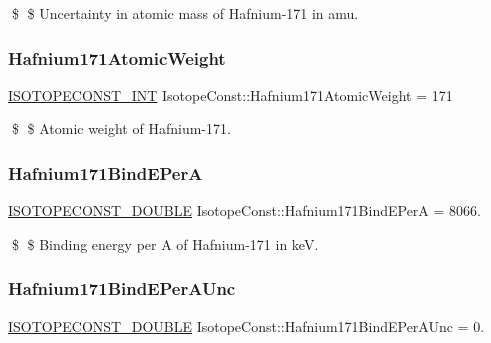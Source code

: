\$ \$ Uncertainty in atomic mass of Hafnium-\/171 in amu. \mbox{\label{group___isotope_const-_hafnium-_hf171_ga7091dd31ee7f01ddaa41bd1d8e7c6b96}} 
\subsubsection{\texorpdfstring{Hafnium171\+Atomic\+Weight}{Hafnium171AtomicWeight}}
{\footnotesize\ttfamily \mbox{\hyperlink{group___isotope_const-_macros_ga5f18360b3e99483a35c32d789e62621c}{I\+S\+O\+T\+O\+P\+E\+C\+O\+N\+S\+T\+\_\+\+I\+NT}} Isotope\+Const\+::\+Hafnium171\+Atomic\+Weight = 171}

\$ \$ Atomic weight of Hafnium-\/171. \mbox{\label{group___isotope_const-_hafnium-_hf171_gab82f5c9732c8b5e2cf70a489c7625055}} 
\subsubsection{\texorpdfstring{Hafnium171\+Bind\+E\+PerA}{Hafnium171BindEPerA}}
{\footnotesize\ttfamily \mbox{\hyperlink{group___isotope_const-_macros_ga8f45a7272ce02c0b4c65c44636ed719a}{I\+S\+O\+T\+O\+P\+E\+C\+O\+N\+S\+T\+\_\+\+D\+O\+U\+B\+LE}} Isotope\+Const\+::\+Hafnium171\+Bind\+E\+PerA = 8066.}

\$ \$ Binding energy per A of Hafnium-\/171 in keV. \mbox{\label{group___isotope_const-_hafnium-_hf171_ga77b8c0ce67a52bcd6bc061fb881cc157}} 
\subsubsection{\texorpdfstring{Hafnium171\+Bind\+E\+Per\+A\+Unc}{Hafnium171BindEPerAUnc}}
{\footnotesize\ttfamily \mbox{\hyperlink{group___isotope_const-_macros_ga8f45a7272ce02c0b4c65c44636ed719a}{I\+S\+O\+T\+O\+P\+E\+C\+O\+N\+S\+T\+\_\+\+D\+O\+U\+B\+LE}} Isotope\+Const\+::\+Hafnium171\+Bind\+E\+Per\+A\+Unc = 0.}

